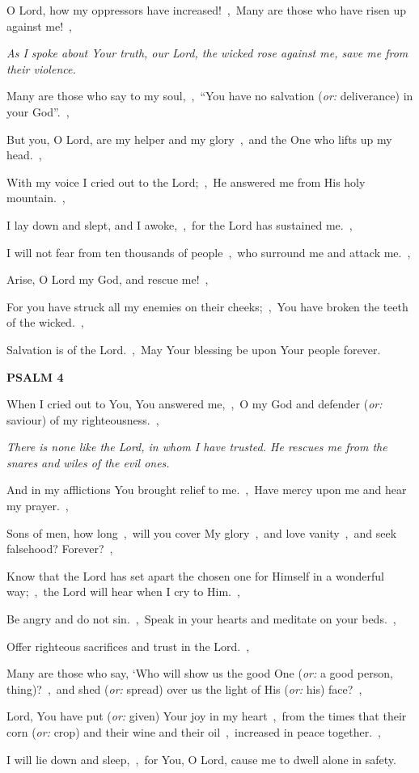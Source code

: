\documentclass[12pt,twoside,a5paper]{article}
\newcommand{\psalm}[1]{\textbf{PSALM {#1}}\nopagebreak}
\newcommand{\qanona}[1]{{\liturgicalhint{Qanona.} \emph{#1}}}
\newcommand{\translationoption}[1]{\emph{or:} #1}
\begin{document}
\begin{normalparskip}
  O Lord, how my oppressors have increased!~\sep\ Many are those who have risen up against me!~\sep

  \qanona{As I spoke about Your truth, our Lord, the wicked rose against me, save me from their violence.}

  Many are those who say to my soul,~\sep\ ``You have no salvation (\translationoption{deliverance}) in your God''.~\sep

  But you, O Lord, are my helper and my glory~\sep\ and the One who lifts up my head.~\sep

  With my voice I cried out to the Lord;~\sep\ He answered me from His holy mountain.~\sep

  I lay down and slept, and I awoke,~\sep\ for the Lord has sustained me.~\sep

  I will not fear from ten thousands of people~\sep\ who surround me and attack me.~\sep

  Arise, O Lord my God, and rescue me!~\sep

  For you have struck all my enemies on their cheeks;~\sep\ You have broken the teeth of the wicked.~\sep

  Salvation is of the Lord.~\sep\ May Your blessing be upon Your people forever.
\end{normalparskip}

\psalm{4}

\begin{normalparskip}
  When I cried out to You, You answered me,~\sep\ O my God and defender (\translationoption{saviour}) of my righteousness.~\sep

  \qanona{There is none like the Lord, in whom I have trusted. He rescues me from the snares and wiles of the evil ones.}

  And in my afflictions You brought relief to me.~\sep\ Have mercy upon me and hear my prayer.~\sep

  Sons of men, how long~\sep\ will you cover My glory~\sep\ and love vanity~\sep\ and seek falsehood? Forever?~\sep

  Know that the Lord has set apart the chosen one for Himself in a wonderful way;~\sep\ the Lord will hear when I cry to Him.~\sep

  Be angry and do not sin.~\sep\ Speak in your hearts and meditate on your beds.~\sep

  Offer righteous sacrifices and trust in the Lord.~\sep

  Many are those who say, ‘Who will show us the good One (\translationoption{a good person, thing})?~\sep\ and shed (\translationoption{spread}) over us the light of His (\translationoption{his}) face?~\sep

  Lord, You have put (\translationoption{given}) Your joy in my heart~\sep\ from the times that their corn (\translationoption{crop}) and their wine and their oil~\sep\ increased in peace together.~\sep

  I will lie down and sleep,~\sep\ for You, O Lord, cause me to dwell alone in safety.
\end{normalparskip}
\end{document}
